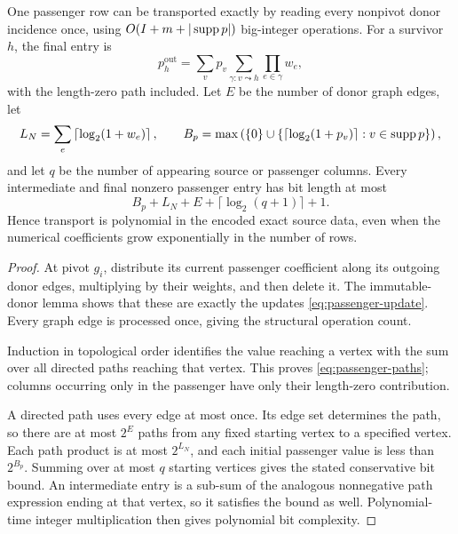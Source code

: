 \begin{theorem}
\label{thm:passenger}
One passenger row can be transported exactly by reading every nonpivot
donor incidence once, using $O(I+m+|\operatorname{supp} p|)$ big-integer operations.
For a survivor $h$, the final entry is
\begin{equation}\label{eq:passenger-paths}
 p_h^{\mathrm{out}}
 =\sum_{v}p_v\sum_{\gamma:v\leadsto h}
          \prod_{e\in\gamma}w_e,
\end{equation}
with the length-zero path included. Let $E$ be the number of donor graph
edges, let
\[
 L_N=\sum_{e}\left\lceil\log_2(1+w_e)\right\rceil,
 \qquad
 B_p=\max\left(\{0\}\cup
       \{\lceil\log_2(1+p_v)\rceil:v\in\operatorname{supp} p\}\right),
\]
and let $q$ be the number of appearing source or passenger columns.
Every intermediate and final nonzero passenger entry has bit length at
most
\begin{equation}\label{eq:passenger-bit}
 B_p+L_N+E+\lceil\log_2(q+1)\rceil+1.
\end{equation}
Hence transport is polynomial in the encoded exact source data, even when
the numerical coefficients grow exponentially in the number of rows.
\end{theorem}

\begin{proof}
At pivot $g_i$, distribute its current passenger coefficient along its
outgoing donor edges, multiplying by their weights, and then delete it.
The immutable-donor lemma shows that these are exactly the updates
\eqref{eq:passenger-update}. Every graph edge is processed once, giving
the structural operation count.

Induction in topological order identifies the value reaching a vertex
with the sum over all directed paths reaching that vertex. This proves
\eqref{eq:passenger-paths}; columns occurring only in the passenger have
only their length-zero contribution.

A directed path uses every edge at most once. Its edge set determines
the path, so there are at most $2^E$ paths from any fixed starting vertex
to a specified vertex. Each path product is at most $2^{L_N}$, and
each initial passenger value is less than $2^{B_p}$. Summing over at most
$q$ starting vertices gives the stated conservative bit bound. An
intermediate entry is a sub-sum of the analogous nonnegative path
expression ending at that vertex, so it satisfies the bound as well.
Polynomial-time integer multiplication
then gives polynomial bit complexity.
\end{proof}

